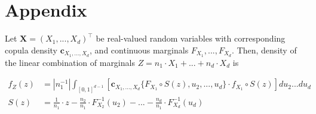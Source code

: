 \newpage
\section{Appendix}\label{sec:appendix}

\begin{proposition}
   Let $\bm{X} = (X_1, ..., X_d)^\top$ be real-valued random variables with corresponding
   copula density $\bm{c}_{X_1, ..., X_d}$, and continuous marginals $F_{X_1}, ..., F_{X_d}$.
   Then,
   density of the linear combination of marginals $Z = n_1 \cdot X_1 + ... +  n_d \cdot X_d $ is

   \begin{align}
   f_Z(z) &= \left| n_1^{-1} \right| \int_{[0,1]^{d-1}} \left[ \bm{c}_{X_1,...,X_d}
      \{F_{X_1} \circ S(z), u_2, ..., u_d \} \cdot
      f_{X_1} \circ S(z) \right] du_2 ... du_d \label{density} \\
      S(z) &= \frac{1}{n_1}\cdot z - \frac{n_2}{n_1} \cdot F^{-1}_{X_2}(u_2) - ... -  \frac{n_d}{n_1} \cdot F^{-1}_{X_d}(u_d)
      \end{align}
   \end{proposition}

